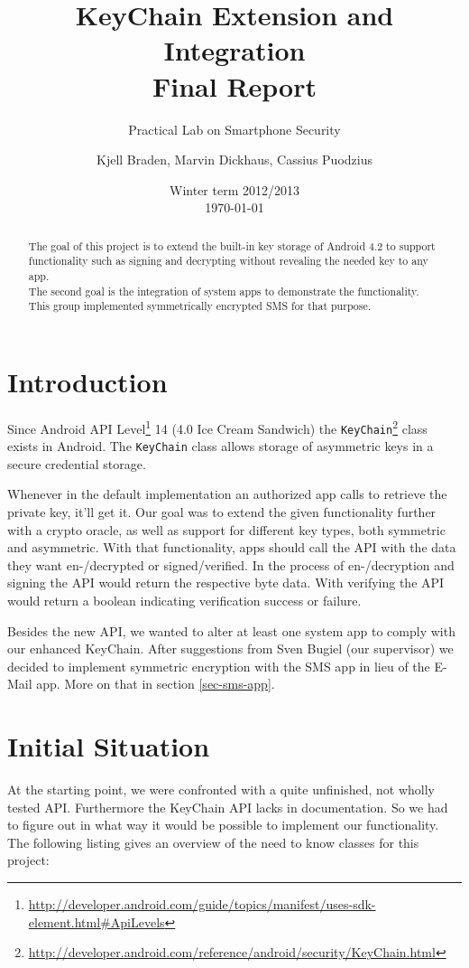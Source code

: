 \documentclass[a4paper,draft]{scrartcl}
\title{KeyChain Extension and Integration\\
	Final Report}
\subtitle{Practical Lab on Smartphone Security}
\author{Kjell Braden, Marvin Dickhaus, Cassius Puodzius}
\date{Winter term 2012/2013\\\today}
\begin{document}
\maketitle

\begin{abstract}
	The goal of this project is to extend the built-in key storage of Android 4.2 to support functionality such as signing and decrypting without revealing the needed key to any app.\\
	The second goal is the integration of system apps to demonstrate the functionality. This group implemented symmetrically encrypted SMS for that purpose.
\end{abstract}

\tableofcontents


\section{Introduction}
	Since Android API Level\footnote{\url{http://developer.android.com/guide/topics/manifest/uses-sdk-element.html\#ApiLevels}} 14 (4.0 Ice Cream Sandwich) the \texttt{KeyChain}\footnote{\url{http://developer.android.com/reference/android/security/KeyChain.html}} class exists in Android. The \texttt{KeyChain} class allows storage of asymmetric keys in a secure credential storage.

	Whenever in the default implementation an authorized app calls to retrieve the private key, it'll get it. Our goal was to extend the given functionality further with a crypto oracle, as well as support for different key types, both symmetric and asymmetric. With that functionality, apps should call the API with the data they want en-/decrypted or signed/verified. In the process of en-/decryption and signing the API would return the respective byte data. With verifying the API would return a boolean indicating verification success or failure.
	
	Besides the new API, we wanted to alter at least one system app to comply with our enhanced KeyChain. After suggestions from Sven Bugiel (our supervisor) we decided to implement symmetric encryption with the SMS app in lieu of the E-Mail app. More on that in section \ref{sec-sms-app}.

\section{Initial Situation}
	At the starting point, we were confronted with a quite unfinished, not wholly tested API. Furthermore the KeyChain API lacks in documentation. So we had to figure out in what way it would be possible to implement our functionality. The following listing gives an overview of the need to know classes for this project:
	
\end{document}
